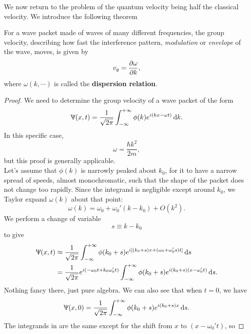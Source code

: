 We now return to the problem of the quantum velocity being half the classical velocity. We introduce the following theorem
\begin{thrm}
For a wave packet made of waves of many different frequencies, the group velocity, describing how fast the interference pattern, \ie \textit{modulation} or \textit{envelope} of the wave, moves, is given by
\begin{equation}
v_g=\diffp{\omega}{k}, 
\end{equation}
where $\omega(k,\cdots)$ is called the \textbf{dispersion relation}. 
\end{thrm}
\begin{proof}
We need to determine the group velocity of a wave packet of the form
\begin{equation}
\ups(x,t)=\frac{1}{\sqrt{2\pi}}\intinf\phi(k)e^{i(kx-\omega t)}\dif k.
\end{equation}
In this specific case,
\begin{equation}
\omega=\frac{\hbar k^2}{2m}, 
\end{equation}
but this proof is generally applicable.\\
Let's assume that $\phi(k)$ is narrowly peaked about $k_0$, 
for it to have a narrow spread of speeds, \ie almost monochromatic, 
such that the shape of the packet does not change too rapidly. 
Since the integrand is negligible except around $k_0$, 
we Taylor expand $\omega(k)$ about that point:
\begin{equation}
\omega(k)=\omega_0+\omega_0'(k-k_0)+O(k^2).
\end{equation}
We perform a change of variable
\begin{equation}
s\equiv k-k_0
\end{equation}
to give
\begin{subequations}
\begin{align}
\ups(x,t)&\approx\frac{1}{\sqrt{2\pi}}\intinf\phi(k_0+s)e^{i[(k_0+s)x+(\omega_0+\omega_0's)t]}\dif s\\
&=\frac{1}{\sqrt{2\pi}}e^{i(-\omega_0 t+k_0\omega_0't)}\intinf\phi(k_0+s)e^{i(k_0+s)(x-\omega_0't)}\dif s. \label{grpvel1}
\end{align}
\end{subequations}
Nothing fancy there, just pure algebra. We can also see that when $t=0$, we have
\begin{equation}
\label{grpvel2}
\ups(x,0)=\frac{1}{\sqrt{2\pi}}\intinf\phi(k_0+s)e^{i(k_0+s)x}\dif s.
\end{equation}
The integrands in  are the same except for the shift from $x$ to $(x-\omega_0't)$, so 

\end{proof}
